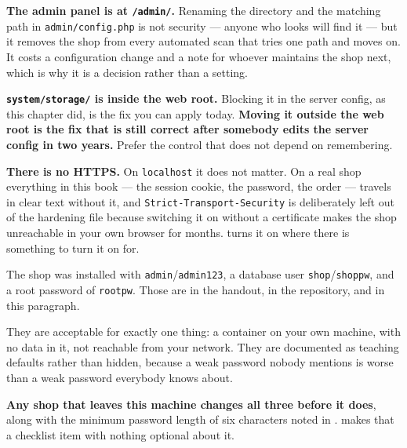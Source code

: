 \begin{conceptbox}
\begin{tightnum}
  \item \textbf{The admin panel is at \texttt{/admin/}.} Renaming the directory
        and the matching path in \texttt{admin/config.php} is not security ---
        anyone who looks will find it --- but it removes the shop from every
        automated scan that tries one path and moves on. It costs a
        configuration change and a note for whoever maintains the shop next,
        which is why it is a decision rather than a setting.
  \item \textbf{\texttt{system/storage/} is inside the web root.} Blocking it
        in the server config, as this chapter did, is the fix you can apply
        today. \textbf{Moving it outside the web root is the fix that is still
        correct after somebody edits the server config in two years.} Prefer
        the control that does not depend on remembering.
  \item \textbf{There is no HTTPS.} On \texttt{localhost} it does not matter.
        On a real shop everything in this book --- the session cookie, the
        password, the order --- travels in clear text without it, and
        \texttt{Strict-Transport-Security} is deliberately left out of the
        hardening file because switching it on without a certificate makes the
        shop unreachable in your own browser for months.
         turns it on where there is something to turn it on for.
\end{tightnum}
\end{conceptbox}

\begin{alertbox}
The shop was installed with \texttt{admin}/\texttt{admin123}, a database user
\texttt{shop}/\texttt{shoppw}, and a root password of \texttt{rootpw}. Those are
in the handout, in the repository, and in this paragraph.

\smallskip
They are acceptable for exactly one thing: a container on your own machine,
with no data in it, not reachable from your network. They are documented as
teaching defaults rather than hidden, because a weak password nobody mentions
is worse than a weak password everybody knows about.

\smallskip
\textbf{Any shop that leaves this machine changes all three before it does},
along with the minimum password length of six characters noted in
.  makes that a checklist item with nothing
optional about it.
\end{alertbox}

